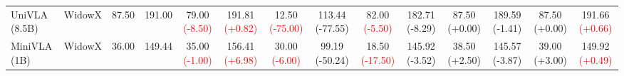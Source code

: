 \begin{table}[t]
{\begin{tabular}{llcccccccccccc}
\cmidrule(lr){1-14}
\multirow{1}{*}{UniVLA (8.5B)} & WidowX & 87.50 & 191.00 & 79.00 {\scriptsize\textcolor{red}{(-8.50)}} & 191.81 {\scriptsize\textcolor{red}{(+0.82)}} & 12.50 {\scriptsize\textcolor{red}{(-75.00)}} & 113.44 {\scriptsize\textcolor{green!50!black}{(-77.55)}} & 82.00 {\scriptsize\textcolor{red}{(-5.50)}} & 182.71 {\scriptsize\textcolor{green!50!black}{(-8.29)}} & 87.50 {\scriptsize\textcolor{green!50!black}{(+0.00)}} & 189.59 {\scriptsize\textcolor{green!50!black}{(-1.41)}} & 87.50 {\scriptsize\textcolor{green!50!black}{(+0.00)}} & 191.66 {\scriptsize\textcolor{red}{(+0.66)}} \\
\cmidrule(lr){1-14}
\multirow{1}{*}{MiniVLA (1B)} & WidowX & 36.00 & 149.44 & 35.00 {\scriptsize\textcolor{red}{(-1.00)}} & 156.41 {\scriptsize\textcolor{red}{(+6.98)}} & 30.00 {\scriptsize\textcolor{red}{(-6.00)}} & 99.19 {\scriptsize\textcolor{green!50!black}{(-50.24)}} & 18.50 {\scriptsize\textcolor{red}{(-17.50)}} & 145.92 {\scriptsize\textcolor{green!50!black}{(-3.52)}} & 38.50 {\scriptsize\textcolor{green!50!black}{(+2.50)}} & 145.57 {\scriptsize\textcolor{green!50!black}{(-3.87)}} & 39.00 {\scriptsize\textcolor{green!50!black}{(+3.00)}} & 149.92 {\scriptsize\textcolor{red}{(+0.49)}} \\
\bottomrule
\end{tabular}%
}
\end{table}

